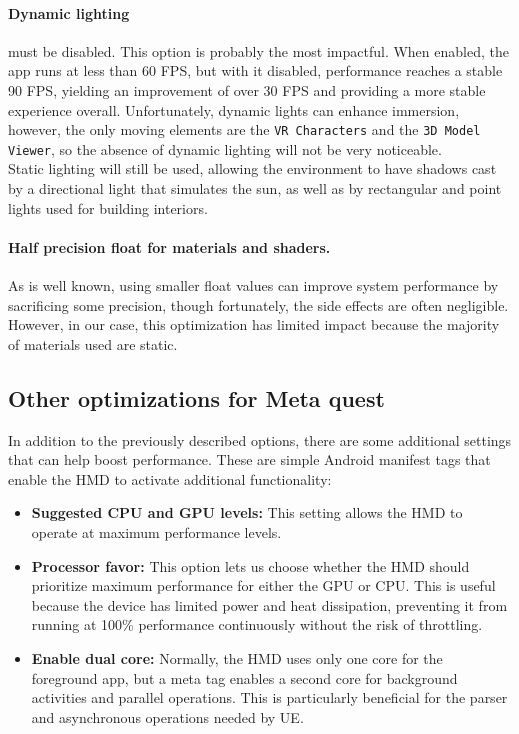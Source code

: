 \paragraph{Dynamic lighting}
must be disabled. This option is probably the most impactful. When enabled, the app runs at less than 60 \ac{FPS}, but with it disabled, performance reaches a stable 90 \ac{FPS}, yielding an improvement of over 30 \ac{FPS} and providing a more stable experience overall.
Unfortunately, dynamic lights can enhance immersion, however, the only moving elements are the \texttt{VR Characters} and the \texttt{3D Model Viewer}, so the absence of dynamic lighting will not be very noticeable.\\
Static lighting will still be used, allowing the environment to have shadows cast by a directional light that simulates the sun, as well as by rectangular and point lights used for building interiors.

\paragraph{Half precision float for materials and shaders.}
As is well known, using smaller float values can improve system performance by sacrificing some precision, though fortunately, the side effects are often negligible.
However, in our case, this optimization has limited impact because the majority of materials used are static.

\subsection{Other optimizations for Meta quest}
\noindent
In addition to the previously described options, there are some additional settings that can help boost performance. These are simple Android manifest tags that enable the \ac{HMD} to activate additional functionality:

\begin{itemize}
  \item \textbf{Suggested CPU and GPU levels:} This setting allows the \ac{HMD} to operate at maximum performance levels.
  \item \textbf{Processor favor:} This option lets us choose whether the \ac{HMD} should prioritize maximum performance for either the GPU or CPU. This is useful because the device has limited power and heat dissipation, preventing it from running at 100\% performance continuously without the risk of throttling.
  \item \textbf{Enable dual core:} Normally, the \ac{HMD} uses only one core for the foreground app, but a meta tag enables a second core for background activities and parallel operations. This is particularly beneficial for the parser and asynchronous operations needed by \ac{UE}.
\end{itemize}

